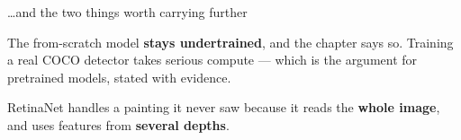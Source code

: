 \documentclass[aspectratio=169,11pt,t]{beamer}
\begin{document}
\begin{frame}[shrink=25]{\ldots{}and the two things worth carrying further}
\begin{minipage}[t]{0.494\textwidth}
\begin{icardwarn}
The from-scratch model \textbf{stays undertrained}, and the chapter says so. Training a real COCO detector takes serious compute --- which is the argument for pretrained models, stated with evidence.
\end{icardwarn}
\end{minipage}%
\hfill
\begin{minipage}[t]{0.494\textwidth}
\begin{icardgood}
RetinaNet handles a painting it never saw because it reads the \textbf{whole image}, and uses features from \textbf{several depths}.
\end{icardgood}
\end{minipage}%
\vskip 4pt
\vskip 2pt
\end{frame}
\end{document}
